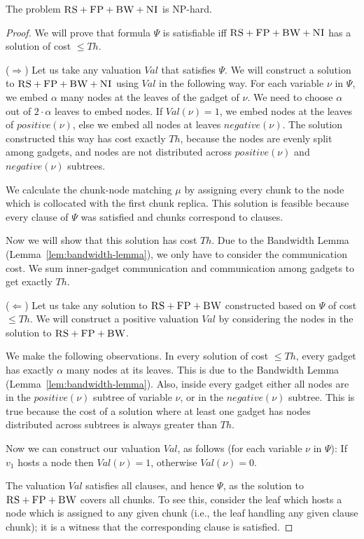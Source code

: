 \documentclass[preprint,12pt]{elsarticle}
\newcommand{\variab}{\nu}
\newcommand{\clauses}{\alpha}
\newcommand{\CC}{\textsc{NI}}
\newcommand{\FP}{\textsc{FP}}
\newcommand{\RS}{\textsc{RS}}
\newcommand{\BW}{\textsc{BW}}
\newcommand{\Formula}{\ensuremath{\Psi}}
\newcommand{\Thr}{\ensuremath{Th}}
\newcommand{\positive}{\ensuremath{positive}}
\newcommand{\negative}{\ensuremath{negative}}
\newcommand{\Val}{\ensuremath{Val}}
\begin{document}
\begin{theorem}
The problem $\RS+\FP+\BW+\CC$ is NP-hard.
\label{theorem:3sat}
\end{theorem}
\begin{proof}
We will prove that formula $\Formula$ is satisfiable iff $\RS+\FP+\BW+\CC$ has
a solution of cost $\leq \Thr$.

($\Rightarrow$) Let us take any valuation $\Val$ that satisfies $\Formula$.
We will construct a solution to $\RS+\FP+\BW+\CC$ using $\Val$ in the following
way.
For each variable $\variab$ in $\Formula$, we embed $\clauses$ many nodes
at the  leaves of the gadget of $\variab$. We need to choose $\clauses$ out of
$2 \cdot \clauses$ leaves to embed nodes. If $\Val(\variab) = 1$, we embed
nodes at the leaves
of $\positive(\variab)$, else we embed all nodes at leaves $\negative(\variab)$.
The solution constructed this way has cost exactly
$\Thr$, because the nodes are evenly split among gadgets, and nodes are not
distributed across $\positive(\variab)$ and $\negative(\variab)$ subtrees.

We calculate the chunk-node matching $\mu$ by assigning every chunk to
the node which is collocated with the first chunk replica. This solution is feasible
because every clause of
$\Psi$ was satisfied and chunks correspond to clauses.

Now we will show that this solution has cost $\Thr$.
Due to the Bandwidth Lemma (Lemma~\ref{lem:bandwidth-lemma}),
we only have to consider the communication cost. We sum inner-gadget communication and communication among gadgets to get exactly $\Thr$.

($\Leftarrow$) Let us take any solution to $\RS+\FP+\BW$ constructed based on $\Formula$ of cost $\leq \Thr$.
We will construct a positive valuation $\Val$ by considering the nodes in
the solution to $\RS+\FP+\BW$.

We make the following observations. In every solution of cost
$\leq \Thr$, every gadget has exactly $\clauses$ many nodes
at its leaves. This is due to the Bandwidth Lemma (Lemma~\ref{lem:bandwidth-lemma}).
Also, inside
every gadget either all nodes are in the $\positive(\variab)$ subtree
of variable $\variab$, or in the $\negative(\variab)$ subtree. This is true
because the cost of a solution where at least one gadget has nodes
distributed across subtrees is
always greater than $\Thr$.

Now we can construct our valuation $\Val$, as follows
(for each variable $\variab$ in $\Formula$):
If $v_1$ hosts a node then $\Val(\variab) = 1$,
otherwise $\Val(\variab) = 0$.

The valuation $\Val$ satisfies all clauses, and hence $\Formula$,
as the solution to $\RS+\FP+\BW$ covers all chunks. To see this,
consider the leaf which
hosts a node which is assigned to any given chunk (i.e.,
the leaf handling any given clause chunk);
it is a witness that the corresponding clause is satisfied.
\end{proof}
\end{document}
